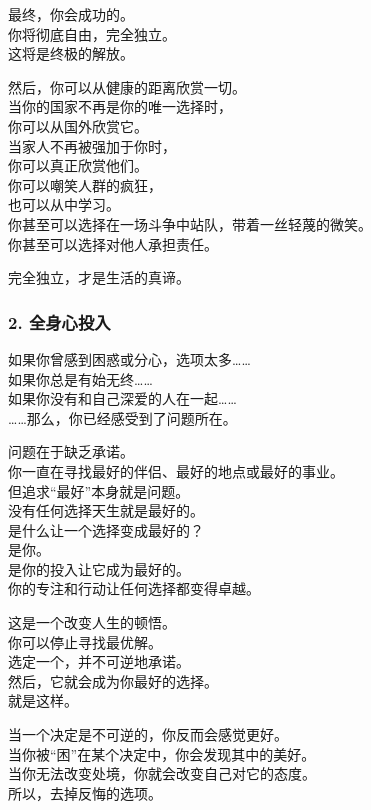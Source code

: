 \documentclass[
]{article}
\begin{document}
最终，你会成功的。\\
你将彻底自由，完全独立。\\
这将是终极的解放。

然后，你可以从健康的距离欣赏一切。\\
当你的国家不再是你的唯一选择时，\\
你可以从国外欣赏它。\\
当家人不再被强加于你时，\\
你可以真正欣赏他们。\\
你可以嘲笑人群的疯狂，\\
也可以从中学习。\\
你甚至可以选择在一场斗争中站队，带着一丝轻蔑的微笑。\\
你甚至可以选择对他人承担责任。

完全独立，才是生活的真谛。

\subsubsection{\texorpdfstring{2. 全身心投入
}{2. 全身心投入 }}\label{2-ux5168ux8eabux5fc3ux6295ux5165}

如果你曾感到困惑或分心，选项太多\ldots\ldots{}\\
如果你总是有始无终\ldots\ldots{}\\
如果你没有和自己深爱的人在一起\ldots\ldots{}\\
\ldots\ldots 那么，你已经感受到了问题所在。

问题在于缺乏承诺。\\
你一直在寻找最好的伴侣、最好的地点或最好的事业。\\
但追求``最好''本身就是问题。\\
没有任何选择天生就是最好的。\\
是什么让一个选择变成最好的？\\
是你。\\
是你的投入让它成为最好的。\\
你的专注和行动让任何选择都变得卓越。

这是一个改变人生的顿悟。\\
你可以停止寻找最优解。\\
选定一个，并不可逆地承诺。\\
然后，它就会成为你最好的选择。\\
就是这样。

当一个决定是不可逆的，你反而会感觉更好。\\
当你被``困''在某个决定中，你会发现其中的美好。\\
当你无法改变处境，你就会改变自己对它的态度。\\
所以，去掉反悔的选项。
\end{document}
